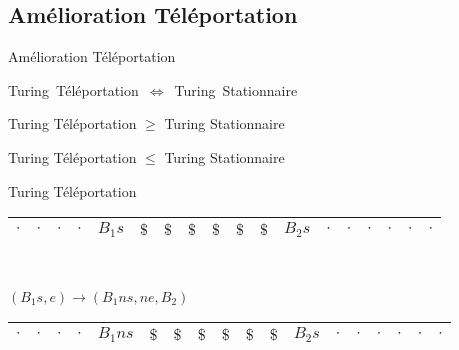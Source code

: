 \documentclass[12pt]{beamer}
\begin{document}
\subsection{Amélioration Téléportation}
\begin{frame}{Amélioration Téléportation}
    \begin{center}
    \mbox{\Large Turing Téléportation $\Longleftrightarrow$ Turing Stationnaire}

    \pause

    \vspace{1cm}

    \Large Turing Téléportation $\geq$ Turing Stationnaire

    \pause

    \vspace{1cm}

    \Large Turing Téléportation $\leq$ Turing Stationnaire
    \end{center}
    
\end{frame}

\begin{frame}{Turing Téléportation}
\begin{center}
    

    \begin{tabular}{|c|c|c|c|c|c|c|c|c|c|c|c|c|c|c|c|c|c|}\hline
     $\cdot$ & $\cdot$ & $\cdot$ & $\cdot$ & $B_1s$ & $\$$ & $\$$ & $\$$ & $\$$ & $\$$ & $\$$ & $B_2s$ & $\cdot$ & $\cdot$ & $\cdot$ & $\cdot$ & $\cdot$ & $\cdot$ \\\hline    
\end{tabular}\\

        \pause

\vspace{0.5cm}

    $(B_1s,e) \longrightarrow (B_1ns, ne, B_2)$\\
    

\begin{tabular}{|c|c|c|c|c|c|c|c|c|c|c|c|c|c|c|c|c|c|}\hline
     $\cdot$ & $\cdot$ & $\cdot$ & $\cdot$ & $B_1ns$ & $\$$ & $\$$ & $\$$ & $\$$ & $\$$ & $\$$ & $B_2s$ & $\cdot$ & $\cdot$ & $\cdot$ & $\cdot$ & $\cdot$ & $\cdot$ \\\hline    
     
\end{tabular}\\

    \end{center}
\end{frame}
\end{document}
